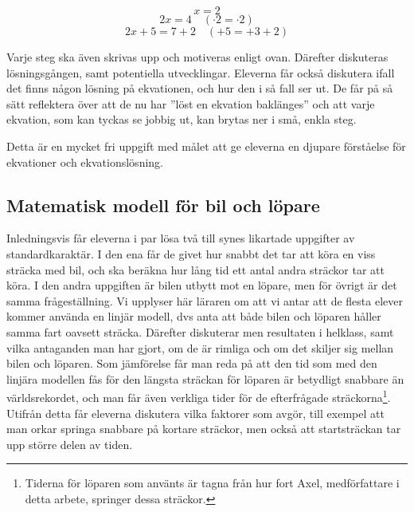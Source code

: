         \begin{equation*}
            x=2
        \end{equation*}
        \begin{equation*}
            2x=4 \quad (\cdot2=\cdot2)
        \end{equation*}
        \begin{equation*}
            2x+5=7+2 \quad (+5=+3+2)
        \end{equation*}
    
    \noindent\textcolor{lila}{Varje steg ska även skrivas upp och motiveras enligt ovan. Därefter diskuteras lösningsgången, samt potentiella utvecklingar. Eleverna får också diskutera ifall det finns någon lösning på ekvationen, och hur den i så fall ser ut. De får på så sätt reflektera över att de nu har ''löst en ekvation baklänges'' och att varje ekvation, som kan tyckas se jobbig ut, kan brytas ner i små, enkla steg.}
    
    \textcolor{lila}{Detta är en mycket fri uppgift med målet att ge eleverna en djupare förståelse för ekvationer och ekvationslösning.}

    

\subsection{Matematisk modell för bil och löpare}
    \label{sec:lopare}
    
    \textcolor{lila}{Inledningsvis får eleverna i par lösa två till synes likartade uppgifter av standardkaraktär. I den ena får de givet hur snabbt det tar att köra en viss sträcka med bil, och ska beräkna hur lång tid ett antal andra sträckor tar att köra. I den andra uppgiften är bilen utbytt mot en löpare, men för övrigt är det samma frågeställning. Vi upplyser här läraren om att vi antar att de flesta elever kommer använda en linjär modell, dvs anta att både bilen och löparen håller samma fart oavsett sträcka. Därefter diskuterar men resultaten i helklass, samt vilka antaganden man har gjort, om de är rimliga och om det skiljer sig mellan bilen och löparen. Som jämförelse får man reda på att den tid som med den linjära modellen fås för den längsta sträckan för löparen är betydligt snabbare än världsrekordet, och man får även verkliga tider för de efterfrågade sträckorna\footnote{Tiderna för löparen som använts är tagna från hur fort Axel, medförfattare i detta arbete, springer dessa sträckor.}. Utifrån detta får eleverna diskutera vilka faktorer som avgör, till exempel att man orkar springa snabbare på kortare sträckor, men också att startsträckan tar upp större delen av tiden. }
    
